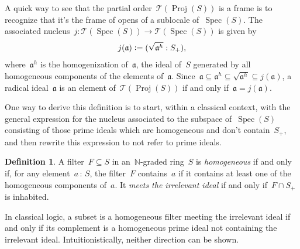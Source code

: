 \documentclass[10pt,reqno,a4paper]{amsbook}
\theoremstyle{definition}
\newtheorem{defn}{Definition}[section]
\theoremstyle{plain}
\theoremstyle{remark}
\newcommand{\T}{\mathcal{T}}
\newcommand{\NN}{\mathbb{N}}
\newcommand{\aaa}{\mathfrak{a}}
\DeclareMathOperator{\Spec}{Spec}
\DeclareMathOperator{\Proj}{Proj}
\newcommand{\Open}{\T}
\newcommand{\?}{\,{:}\,}
\renewcommand{\_}{\mathpunct{.}\,}
\newcommand{\defeq}{\vcentcolon=}
\begin{document}
A quick way to see that the partial order~$\Open(\Proj(S))$ is a frame is to
recognize that it's the frame of opens of a sublocale of~$\Spec(S)$.
The associated nucleus~$j : \Open(\Spec(S)) \to \Open(\Spec(S))$ is given by
\[ j(\aaa) \defeq
  (\sqrt{\aaa^h} : S_+), \]
where~$\aaa^h$ is the homogenization of~$\aaa$, the ideal of~$S$ generated by
all homogeneous components of the elements of~$\aaa$. Since~$\aaa \subseteq
\aaa^h \subseteq \sqrt{\aaa^h} \subseteq j(\aaa)$, a radical ideal~$\aaa$
is an element of~$\Open(\Proj(S))$ if and only if~$\aaa = j(\aaa)$.

One way to derive this definition is to start, within a classical context, with
the general expression for the nucleus associated to the subspace of~$\Spec(S)$
consisting of those prime ideals which are homogeneous and don't
contain~$S_+$, and then rewrite this expression to not refer to prime ideals.

\begin{defn}A filter~$F \subseteq S$ in an~$\NN$-graded ring~$S$ is
\emph{homogeneous} if and only if, for any element~$a \? S$, the filter~$F$
contains~$a$ if it contains at least one of the homogeneous components of~$a$.
It \emph{meets the irrelevant ideal} if and only if~$F \cap S_+$ is
inhabited.\end{defn}

In classical logic, a subset is a homogeneous filter meeting the irrelevant
ideal if and only if its complement is a homogeneous prime ideal not containing
the irrelevant ideal. Intuitionistically, neither direction can be shown.
\end{document}
